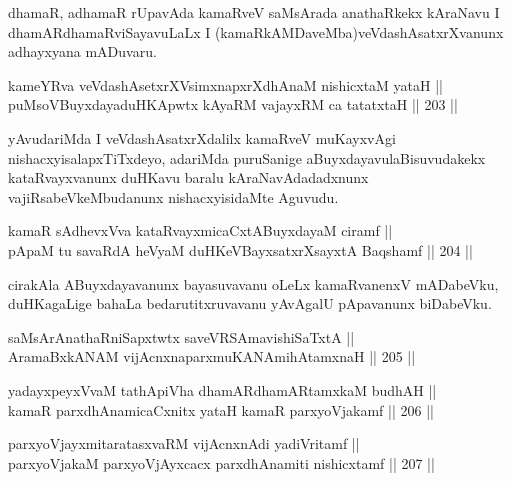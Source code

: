 \begin{artha}
dhamaR, adhamaR rUpavAda kamaRveV saMsArada anathaRkekx kAraNavu I
dhamARdhamaRviSayavuLaLx I (kamaRkAMDaveMba)veVdashAsatxrXvanunx
adhayxyana mADuvaru.
\end{artha}


\begin{shl}
kameYRva veVdashAsetxrXV\s simxnapxrXdhAnaM nishicxtaM yataH || \\
puMsoV\s BuyxdayaduHKApwtx kAyaRM vajayxRM ca tatatxtaH ||  203 ||  
\end{shl}

\begin{artha}
yAvudariMda I veVdashAsatxrXdalilx kamaRveV muKayxvAgi
nishacxyisalapxTiTxdeyo, adariMda puruSanige aBuyxdayavulaBisuvudakekx
kataRvayxvanunx duHKavu baralu kAraNavAdadadxnunx
vajiRsabeVkeMbudanunx nishacxyisidaMte Aguvudu.
\end{artha}

\begin{shl}
kamaR sAdhevxVva kataRvayxmicaCxtA\s BuyxdayaM ciramf || \\
pApaM tu savaRdA heVyaM duHKeVBayxsatxrXsayxtA Baqshamf ||  204 ||  
\end{shl}

\begin{artha}
cirakAla ABuyxdayavanunx bayasuvavanu oLeLx kamaRvanenxV mADabeVku,
duHKagaLige bahaLa bedarutitxruvavanu yAvAgalU pApavanunx biDabeVku.
\end{artha}


\begin{shl}
saMsArAnathaRniSapxtwtx saveVRSAmavishiSaTxtA || \\
AramaBxkANAM vijAcnxnaparxmuKANAmihA\s \s tamxnaH ||  205 ||  
\end{shl}

\begin{shl}
yadayxpeyxVvaM tathA\s piVha dhamARdhamARtamxkaM budhAH || \\
kamaR parxdhAnamicaCxnitx yataH kamaR parxyoVjakamf ||  206 ||  
\end{shl}

\begin{shl}
parxyoVjayxmitaratasxvaRM vijAcnxnAdi yadiVritamf ||  \\
parxyoVjakaM parxyoVjAyxcacx parxdhAnamiti nishicxtamf ||  207 ||  
\end{shl}

